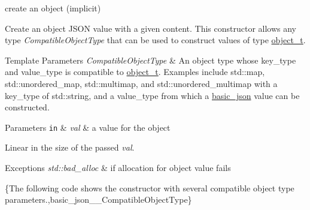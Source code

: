create an object (implicit) 

Create an object J\-S\-O\-N value with a given content. This constructor allows any type {\itshape Compatible\-Object\-Type} that can be used to construct values of type \hyperlink{classnlohmann_1_1basic__json_a0ac9894c9de8dc551cf2e5f1c605537f}{object\-\_\-t}.


\begin{DoxyTemplParams}{Template Parameters}
{\em Compatible\-Object\-Type} & An object type whose {\ttfamily key\-\_\-type} and {\ttfamily value\-\_\-type} is compatible to \hyperlink{classnlohmann_1_1basic__json_a0ac9894c9de8dc551cf2e5f1c605537f}{object\-\_\-t}. Examples include {\ttfamily std\-::map}, {\ttfamily std\-::unordered\-\_\-map}, {\ttfamily std\-::multimap}, and {\ttfamily std\-::unordered\-\_\-multimap} with a {\ttfamily key\-\_\-type} of {\ttfamily std\-::string}, and a {\ttfamily value\-\_\-type} from which a \hyperlink{classnlohmann_1_1basic__json}{basic\-\_\-json} value can be constructed.\\
\hline
\end{DoxyTemplParams}

\begin{DoxyParams}[1]{Parameters}
\mbox{\tt in}  & {\em val} & a value for the object\\
\hline
\end{DoxyParams}
Linear in the size of the passed {\itshape val}.


\begin{DoxyExceptions}{Exceptions}
{\em std\-::bad\-\_\-alloc} & if allocation for object value fails\\
\hline
\end{DoxyExceptions}
\{The following code shows the constructor with several compatible object type parameters.,basic\-\_\-json\-\_\-\-\_\-\-Compatible\-Object\-Type\}

